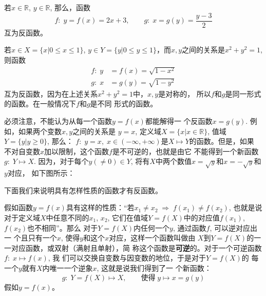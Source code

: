\begin{example}
    若$x\in\mathbb{R}$, $y\in\mathbb{R}$, 那么，函数
\[f:\; y=f(x)=2x+3,\qquad g:\; x=g(y)=\frac{y-3}{2}\]
互为反函数。
\end{example}


\begin{example}
 若$x\in X=\{x|0\le x\le 1\}$, $y\in Y=\{y|0\le y\le 1\}$，而$x,y$之间的关系是$x^2+y^2=1$, 则函数
\[\begin{split}
  f:\; y&=f(x)=\sqrt{1-x^2}\\
g:\; x&=g(y)=\sqrt{1-y^2}   
\end{split}\]
互为反函数，因为在上述关系$x^2+y^2=1$中，$x,y$是对称的，
所以$f$和$g$是同一形式的函数。在一般情况下$f$和$g$是不同
形式的函数。
\end{example}

必须注意，不能认为从每一个函数$y=f(x)$都能解得一
个反函数$x=g(y)$. 例如，如果两个变数$x,y$之间的关系是
$y=x$, 定义域$X=\{x|x\in\mathbb{R}\}$, 值域$Y=\{y|y\ge 0\}$, 那么：
$f:\; y=x,\; x\in (-\infty,+\infty)$是$X\mapsto Y$的函数。但是，如果
不对自变数$x$加以限制，这个函数$f$是不可逆的，也就是由它
不能得到一个新函数$g:\; Y\mapsto X$. 因为，对于每个$y(\ne 0)\in Y$, 
将有$X$中两个数值$x=\sqrt{y}$和$x=-\sqrt{y}$和$y$对应，
如下图所示：

\begin{figure}[htp]
    \centering
    \caption{}
\end{figure}


下面我们来说明具有怎样性质的函数才有反函数。

假如函数$y=f(x)$具有这样的性质：“若$x_1\ne x_2\; \Rightarrow\; f(x_1)\ne f(x_2)$, 也就是说对于定义域$X$中任意不同的$x_1$, $x_2$, 它们在值域$Y=f(X)$中的对应值$f(x_1)$, $f(x_2)$也不相同”。那么
对于$Y=f(X)$内任何一个$y$, 通过函数$f$, 可以逆对应出一
个且只有一个$x$, 使得$y$和这个$x$对应，这样一个函数叫做由
$X$到$Y=f(X)$的一一对应函数，或双射（满射且单射），简
称这个函数是\textbf{可逆}的。对于一个可逆函数$f:\; x\mapsto f(x)$, 我
们可以交换自变数与因变数的地位，于是对于$Y=f(X)$的
每一个$y$就有$X$内唯一一个逆象$x$, 这就是说我们得到了一
个新函数：
\[ g:\; Y=f(X)\mapsto X,\qquad \text{使得}\; y\mapsto x=g(y)\]
假如$y=f(x)$。

